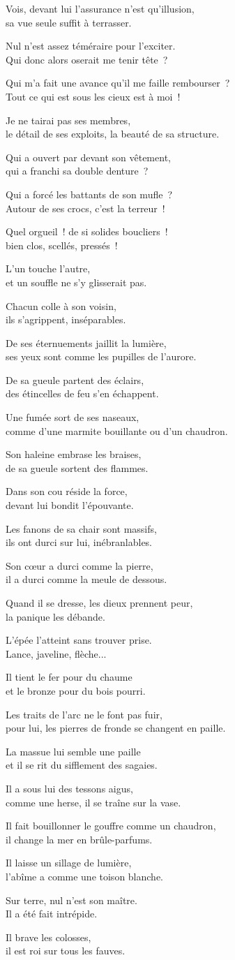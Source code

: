 \documentclass[twoside]{book} %
\newcommand{\lnatt}[1]{\reversemarginpar\marginpar[\sffamily\scriptsize #1]{}}
\newcommand{\lpar}[1]{\noindent\hangindent=2\parindent  #1\par} %
\newcommand\chaptercont{} %
\newcommand\chapterclose{} %
\renewcommand{\lnatt}[1]{\marginpar{\sffamily\scriptsize #1}}
\begin{document}
\chaptercont
\lpar{Vois, devant lui l’assurance n’est qu’illusion, \\
sa vue seule suffit à terrasser.}
\lpar{Nul n’est assez téméraire pour l’exciter. \\
Qui donc alors oserait me tenir tête ?}
\lpar{Qui m’a fait une avance qu’il me faille rembourser ? \\
Tout ce qui est sous les cieux est à moi !}
\bigskip
\lpar{Je ne tairai pas ses membres, \\
le détail de ses exploits, la beauté de sa structure.}
\lpar{\lnatt{5}Qui a ouvert par devant son vêtement, \\
qui a franchi sa double denture ?}
\lpar{Qui a forcé les battants de son mufle ? \\
Autour de ses crocs, c’est la terreur !}
\lpar{Quel orgueil ! de si solides boucliers ! \\
bien clos, scellés, pressés !}
\lpar{L’un touche l’autre, \\
et un souffle ne s’y glisserait pas.}
\lpar{Chacun colle à son voisin, \\
ils s’agrippent, inséparables.}
\lpar{\lnatt{10}De ses éternuements jaillit la lumière, \\
ses yeux sont comme les pupilles de l’aurore.}
\lpar{De sa gueule partent des éclairs, \\
des étincelles de feu s’en échappent.}
\lpar{Une fumée sort de ses naseaux, \\
comme d’une marmite bouillante ou d’un chaudron.}
\lpar{Son haleine embrase les braises, \\
de sa gueule sortent des flammes.}
\lpar{Dans son cou réside la force, \\
devant lui bondit l’épouvante.}
\lpar{\lnatt{15}Les fanons de sa chair sont massifs, \\
ils ont durci sur lui, inébranlables.}
\lpar{Son cœur a durci comme la pierre, \\
il a durci comme la meule de dessous.}
\lpar{Quand il se dresse, les dieux prennent peur, \\
la panique les débande.}
\lpar{L’épée l’atteint sans trouver prise. \\
Lance, javeline, flèche...}
\lpar{Il tient le fer pour du chaume \\
et le bronze pour du bois pourri.}
\lpar{\lnatt{20}Les traits de l’arc ne le font pas fuir, \\
pour lui, les pierres de fronde se changent en paille.}
\lpar{La massue lui semble une paille \\
et il se rit du sifflement des sagaies.}
\bigskip
\lpar{Il a sous lui des tessons aigus, \\
comme une herse, il se traîne sur la vase.}
\lpar{Il fait bouillonner le gouffre comme un chaudron, \\
il change la mer en brûle-parfums.}
\lpar{Il laisse un sillage de lumière, \\
l’abîme a comme une toison blanche.}
\lpar{\lnatt{25}Sur terre, nul n’est son maître. \\
Il a été fait intrépide.}
\lpar{Il brave les colosses, \\
il est roi sur tous les fauves.}
\chapterclose
\end{document}
